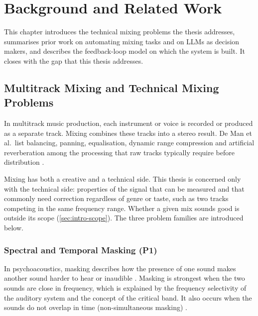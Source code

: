 \chapter{Background and Related Work}
\label{ch:background}

This chapter introduces the technical mixing problems the thesis addresses, summarises prior work on automating mixing tasks and on \acsp{LLM} as decision makers, and describes the feedback-loop model on which the system is built. It closes with the gap that this thesis addresses.


\section{Multitrack Mixing and Technical Mixing Problems}
\label{sec:bg-mixing}

In multitrack music production, each instrument or voice is recorded or produced as a separate track. Mixing combines these tracks into a stereo result. De Man et al.\ list balancing, panning, equalisation, dynamic range compression and artificial reverberation among the processing that raw tracks typically require before distribution \cite{DeMan2017TenYears}.

Mixing has both a creative and a technical side. This thesis is concerned only with the technical side: properties of the signal that can be measured and that commonly need correction regardless of genre or taste, such as two tracks competing in the same frequency range. Whether a given mix sounds good is outside its scope (\autoref{sec:intro-scope}). The three problem families are introduced below.

\subsection{Spectral and Temporal Masking (P1)}
\label{sec:bg-masking}

In psychoacoustics, masking describes how the presence of one sound makes another sound harder to hear or inaudible \cite{Moore2012}. Masking is strongest when the two sounds are close in frequency, which is explained by the frequency selectivity of the auditory system and the concept of the critical band. It also occurs when the sounds do not overlap in time (non-simultaneous masking) \cite{Moore2012}. 

